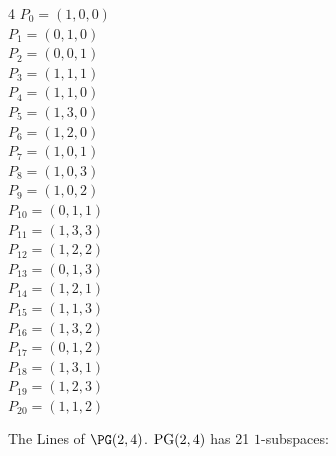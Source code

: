 \begin{multicols}{4}
$P_{0}=( 1, 0, 0 )$\\
$P_{1}=( 0, 1, 0 )$\\
$P_{2}=( 0, 0, 1 )$\\
$P_{3}=( 1, 1, 1 )$\\
$P_{4}=( 1, 1, 0 )$\\
$P_{5}=( 1, 3, 0 )$\\
$P_{6}=( 1, 2, 0 )$\\
$P_{7}=( 1, 0, 1 )$\\
$P_{8}=( 1, 0, 3 )$\\
$P_{9}=( 1, 0, 2 )$\\
$P_{10}=( 0, 1, 1 )$\\
$P_{11}=( 1, 3, 3 )$\\
$P_{12}=( 1, 2, 2 )$\\
$P_{13}=( 0, 1, 3 )$\\
$P_{14}=( 1, 2, 1 )$\\
$P_{15}=( 1, 1, 3 )$\\
$P_{16}=( 1, 3, 2 )$\\
$P_{17}=( 0, 1, 2 )$\\
$P_{18}=( 1, 3, 1 )$\\
$P_{19}=( 1, 2, 3 )$\\
$P_{20}=( 1, 1, 2 )$\\
\end{multicols}
The Lines of ${\rm \PG}(2,4)$.
${\rm PG}(2, 4)$ has 21 $1$-subspaces:\\

